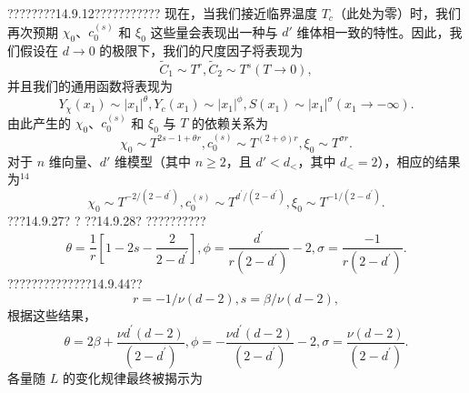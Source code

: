 ????????14.9.12???????????
现在，当我们接近临界温度 \(T_{c}\)（此处为零）时，我们再次预期 \(\chi_{0}\)、\(c_{0}^{(s)}\) 和 \(\xi_{0}\) 这些量会表现出一种与 \(d'\) 维体相一致的特性。因此，我们假设在 \(d \rightarrow 0\) 的极限下，我们的尺度因子将表现为
\begin{equation}\tag{14.4.77}\label{eq:14.4.77}
\tilde { C } _ { 1 } \sim T ^{r} ,  \tilde { C } _ { 2 } \sim T ^{s}  ( T \to 0 ) ,
\end{equation}
并且我们的通用函数将表现为
\begin{equation}\tag{14.4.78}\label{eq:14.4.78}
Y _ { \chi } ( x _ { 1 } ) \sim | x _ { 1 } | ^{\theta} ,  Y _ { c } ( x _ { 1 } ) \sim | x _ { 1 } | ^{\phi} ,  S ( x _ { 1 } ) \sim | x _ { 1 } | ^{\sigma}  ( x _ { 1 } \to - \infty ) .
\end{equation}
由此产生的 \(\chi_{0}\)、\(c_{0}^{(s)}\) 和 \(\xi_{0}\) 与 \(T\) 的依赖关系为
\begin{equation}\tag{14.4.79}\label{eq:14.4.79}
\chi _ { 0 } \sim T ^{2 s - 1 + \theta r} ,  c _ { 0 } ^{( s )} \sim T ^{( 2 + \phi ) r} ,  \xi _ { 0 } \sim T ^{\sigma r} .
\end{equation}
对于 \(n\) 维向量、\(d'\) 维模型（其中 \(n \geq 2\)，且 \(d' < d_{<}\)，其中 \(d_{<} = 2\)），相应的结果为\(^{14}\)
\begin{equation}\tag{14.4.80}\label{eq:14.4.80}
\chi _ { 0 } \sim T ^{- 2 / ( 2 - d ^ { \prime} ) } ,  c _ { 0 } ^{( s )} \sim T ^{d ^ { \prime} / ( 2 - d ^{\prime} ) } ,  \xi _ { 0 } \sim T ^{- 1 / ( 2 - d ^ { \prime} ) } .
\end{equation}
???14.9.27? ? ??14.9.28? ??????????
\begin{equation}\tag{14.4.81}\label{eq:14.4.81}
\theta = \frac { 1 } { r } \left[ 1 - 2 s - \frac { 2 } { 2 - d ^{\prime} } \right] ,  \phi = \frac { d ^{\prime} } { r ( 2 - d ^{\prime} ) } - 2 ,  \sigma = \frac { - 1 } { r ( 2 - d ^{\prime} ) } .
\end{equation}
??????????????14.9.44??
\begin{equation}\tag{14.4.82}\label{eq:14.4.82}
r = - 1 / \nu ( d - 2 ) ,  s = \beta / \nu ( d - 2 ) ,
\end{equation}
根据这些结果，
\begin{equation}\tag{14.4.83}\label{eq:14.4.83}
\theta = 2 \beta + \frac { \nu d ^{\prime} ( d - 2 ) } { ( 2 - d ^{\prime} ) } ,  \phi = - \frac { \nu d ^{\prime} ( d - 2 ) } { ( 2 - d ^{\prime} ) } - 2 ,  \sigma = \frac { \nu ( d - 2 ) } { ( 2 - d ^{\prime} ) } .
\end{equation}
各量随 \(L\) 的变化规律最终被揭示为
